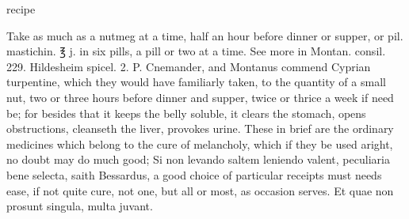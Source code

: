 \begin{Prescription}
{%
\noindent{}%
\par\noindent{}
}
\caption{ recipe}
\end{Prescription}

Take as much as a nutmeg at a time, half an hour before dinner
or supper, or pil. mastichin. ℥ j. in six pills, a pill or two at a
time. See more in Montan. consil. 229. Hildesheim spicel. 2. P.
Cnemander, and Montanus commend Cyprian turpentine, which they
would have familiarly taken, to the quantity of a small nut, two or
three hours before dinner and supper, twice or thrice a week if need
be; for besides that it keeps the belly soluble, it clears the stomach,
opens obstructions, cleanseth the liver, provokes urine.
These in brief are the ordinary medicines which belong to the cure of
melancholy, which if they be used aright, no doubt may do much good; Si
non levando saltem leniendo valent, peculiaria bene selecta, saith
Bessardus, a good choice of particular receipts must needs ease, if not
quite cure, not one, but all or most, as occasion serves. Et quae non
prosunt singula, multa juvant.
